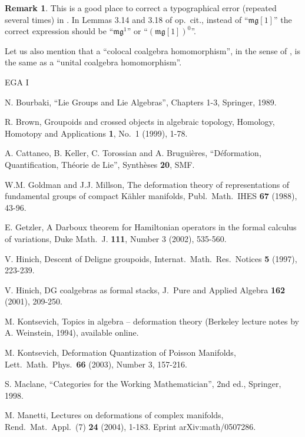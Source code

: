 \documentclass[a4paper,10pt]{amsart}
\theoremstyle{definition}
\newtheorem{rem}[equation]{Remark}
\numberwithin{equation}{section}
\newcommand{\mfrak}[1]{\mathfrak{#1}}
\newcommand{\g}{\mfrak{g}}
\newcommand{\m}{\mfrak{m}}
\begin{document}
\begin{rem}
This is a good place to correct a typographical error (repeated several
times) in \cite[Section 3]{Ye2}. In Lemmas 3.14 and 3.18 of op.\ cit., instead
of ``$\m \g [1]$'' the correct expression should be ``$\m \g^1$'' or
``$(\m \g [1])^0$''.

Let us also mention that a ``colocal coalgebra homomorphism'', in the sense of 
\cite[Definition 3.3]{Ye2}, is the same as a ``unital coalgebra homomorphism''.
\end{rem}






\begin{thebibliography}{EGA I}

 N. Bourbaki, ``Lie Groups and Lie Algebras'', Chapters 1-3,
Springer, 1989.

 R. Brown,
  Groupoids and crossed objects in algebraic topology,
  Homology, Homotopy and Applications {\bf 1}, No.\ 1 (1999), 1-78.

 A. Cattaneo, B. Keller, C. Torossian and A. Brugui\`{e}res,
``D\'eformation, Quantification, Th\'eorie de Lie'',
Synth\`eses {\bf 20}, SMF.

 W.M. Goldman and J.J. Millson, 
The deformation theory of representations of fundamental groups of
compact K\"{a}hler manifolds, Publ.\ Math.\ IHES {\bf 67} (1988), 43-96.

 E. Getzler,
	A Darboux theorem for Hamiltonian operators in the formal
	calculus of variations,
	Duke Math.\ J. {\bf 111}, Number 3 (2002), 535-560. 

 V. Hinich, Descent of Deligne groupoids, 
Internat.\ Math.\ Res.\ Notices {\bf 5} (1997), 223-239.

 V. Hinich, DG coalgebras as formal stacks,
J.\ Pure and Applied Algebra {\bf 162} (2001), 209-250.

 M. Kontsevich, 
Topics in algebra -- deformation theory
(Berkeley lecture notes by A. Weinstein, 1994), available online. 

 M. Kontsevich, 
Deformation Quantization of Poisson Manifolds,
Lett.\ Math.\ Phys.\ {\bf 66} (2003), Number 3, 157-216.


 S. Maclane,
``Categories for the Working Mathematician'', 2nd ed., Springer, 1998.

 M. Manetti, 
Lectures on deformations of complex manifolds,
Rend.\ Mat.\ Appl.\ (7) {\bf 24} (2004), 1-183. 
Eprint arXiv:math/0507286. 


\end{thebibliography}
\end{document}
